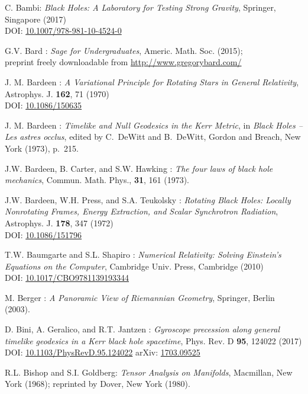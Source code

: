 \begin{thebibliography}{123}
C. Bambi: {\em Black Holes: A Laboratory for Testing Strong Gravity},
Springer, Singapore (2017)\\
DOI: \href{https://doi.org/10.1007/978-981-10-4524-0}{10.1007/978-981-10-4524-0}

G.V. Bard : {\em Sage for Undergraduates}, Americ. Math. Soc. (2015); \\
preprint freely downloadable from \url{http://www.gregorybard.com/}

J. M. Bardeen : {\em A Variational Principle for Rotating Stars in General Relativity},
Astrophys. J. {\bf  162}, 71 (1970)\\
DOI: \href{https://doi.org/10.1086/150635}{10.1086/150635}

J. M. Bardeen : {\em Timelike and Null Geodesics in the Kerr Metric},
in {\em Black Holes -- Les astres occlus},  edited by C.~DeWitt and B.~DeWitt,
Gordon and Breach, New York (1973), p.~215.

J.W. Bardeen, B. Carter, and S.W. Hawking : {\em The four laws of black
hole mechanics}, Commun. Math. Phys., {\bf 31}, 161 (1973).

J.W. Bardeen, W.H. Press, and S.A. Teukolsky :
{\em Rotating Black Holes: Locally Nonrotating Frames, Energy Extraction, and Scalar Synchrotron Radiation},
Astrophys. J. {\bf  178}, 347 (1972)\\
DOI: \href{https://doi.org/10.1086/151796}{10.1086/151796}

T.W. Baumgarte and S.L. Shapiro :
{\em Numerical Relativity: Solving Einstein's Equations on the Computer},
Cambridge Univ. Press, Cambridge (2010)\\
DOI: \href{https://doi.org/10.1017/CBO9781139193344}{10.1017/CBO9781139193344}

M. Berger : {\em A Panoramic View of Riemannian Geometry},
Springer, Berlin (2003).

D. Bini, A. Geralico, and R.T. Jantzen :
{\em Gyroscope precession along general timelike geodesics in a Kerr black hole spacetime},
Phys. Rev. D {\bf 95}, 124022 (2017)\\
DOI: \href{https://doi.org/10.1103/PhysRevD.95.124022}{10.1103/PhysRevD.95.124022}\hfill
arXiv: \href{https://arxiv.org/abs/1703.09525}{1703.09525}

R.L. Bishop and S.I. Goldberg:
{\em Tensor Analysis on Manifolds},
Macmillan, New York (1968); reprinted by Dover, New York (1980).


\end{thebibliography}
